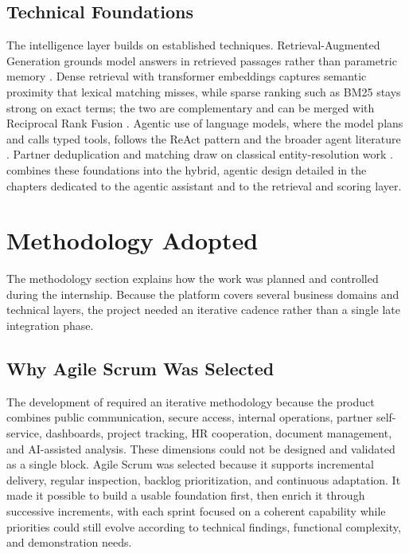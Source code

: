 \subsection{Technical Foundations}
The intelligence layer builds on established techniques. Retrieval-Augmented Generation grounds model answers in retrieved passages rather than parametric memory . Dense retrieval with transformer embeddings  captures semantic proximity that lexical matching misses, while sparse ranking such as BM25  stays strong on exact terms; the two are complementary and can be merged with Reciprocal Rank Fusion . Agentic use of language models, where the model plans and calls typed tools, follows the ReAct pattern and the broader agent literature . Partner deduplication and matching draw on classical entity-resolution work . \projectname{} combines these foundations into the hybrid, agentic design detailed in the chapters dedicated to the agentic assistant and to the retrieval and scoring layer.
\section{Methodology Adopted}
The methodology section explains how the work was planned and controlled during the internship. Because the platform covers several business domains and technical layers, the project needed an iterative cadence rather than a single late integration phase.
\subsection{Why Agile Scrum Was Selected}
The development of \projectname{} required an iterative methodology because the product combines public communication, secure access, internal operations, partner self-service, dashboards, project tracking, HR cooperation, document management, and AI-assisted analysis. These dimensions could not be designed and validated as a single block. Agile Scrum was selected because it supports incremental delivery, regular inspection, backlog prioritization, and continuous adaptation. It made it possible to build a usable foundation first, then enrich it through successive increments, with each sprint focused on a coherent capability while priorities could still evolve according to technical findings, functional complexity, and demonstration needs.
